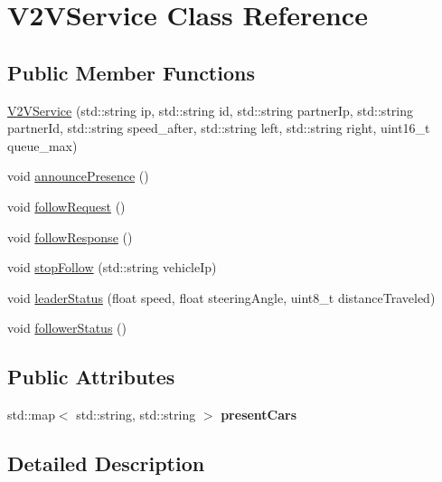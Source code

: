 \hypertarget{class_v2_v_service}{}\section{V2\+V\+Service Class Reference}
\label{class_v2_v_service}
\subsection*{Public Member Functions}
\begin{DoxyCompactItemize}
\item 
\mbox{\hyperlink{class_v2_v_service_a26d77b5b1e8f2d11a51d3dc6ca9751bb}{V2\+V\+Service}} (std\+::string ip, std\+::string id, std\+::string partner\+Ip, std\+::string partner\+Id, std\+::string speed\+\_\+after, std\+::string left, std\+::string right, uint16\+\_\+t queue\+\_\+max)
\item 
void \mbox{\hyperlink{class_v2_v_service_a1e2f575ac83bebcda2c557d425b3050f}{announce\+Presence}} ()
\item 
void \mbox{\hyperlink{class_v2_v_service_aa7ba49b6b0a128a10c12f96066107590}{follow\+Request}} ()
\item 
void \mbox{\hyperlink{class_v2_v_service_aaeec2a1f903f5c774a9e874776f1e8eb}{follow\+Response}} ()
\item 
void \mbox{\hyperlink{class_v2_v_service_ad25bfe4c2a0a170f06a1a1f0bf7965c7}{stop\+Follow}} (std\+::string vehicle\+Ip)
\item 
void \mbox{\hyperlink{class_v2_v_service_a6ea5f4b01830ea6e04837a7bd1774b6e}{leader\+Status}} (float speed, float steering\+Angle, uint8\+\_\+t distance\+Traveled)
\item 
void \mbox{\hyperlink{class_v2_v_service_acbf3639c3cbf7610e1c20967ccbab61b}{follower\+Status}} ()
\end{DoxyCompactItemize}
\subsection*{Public Attributes}
\begin{DoxyCompactItemize}
\item 
\mbox{\label{class_v2_v_service_a6e927ef768feea893ccfdc0f16a52b52}} 
std\+::map$<$ std\+::string, std\+::string $>$ {\bfseries present\+Cars}
\end{DoxyCompactItemize}


\subsection{Detailed Description}


